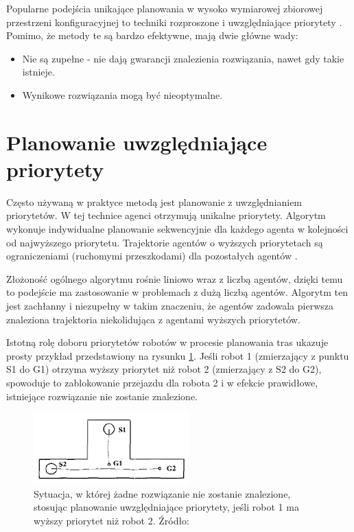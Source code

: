 Popularne podejścia unikające planowania w wysoko wymiarowej zbiorowej przestrzeni konfiguracyjnej to techniki rozproszone i uwzględniające priorytety \cite{optpriorities}.
Pomimo, że metody te są bardzo efektywne, mają dwie główne wady:
\vspace{-0.5em}
\begin{itemize}[itemsep=0em]
	\item Nie są zupełne - nie dają gwarancji znalezienia rozwiązania, nawet gdy takie istnieje.
	\item Wynikowe rozwiązania mogą być nieoptymalne.
\end{itemize}


\section{Planowanie uwzględniające priorytety}
Często używaną w praktyce metodą jest planowanie z uwzględnianiem priorytetów. 
W tej technice agenci otrzymują unikalne priorytety. Algorytm wykonuje indywidualne planowanie sekwencyjnie dla każdego agenta w kolejności od najwyższego priorytetu. Trajektorie agentów o wyższych priorytetach są ograniczeniami (ruchomymi przeszkodami) dla pozostałych agentów \cite{async_decentralized_spacetime_cp}.

Złożoność ogólnego algorytmu rośnie liniowo wraz z liczbą agentów, dzięki temu to podejście ma zastosowanie w problemach z dużą liczbą agentów.
Algorytm ten jest zachłanny i niezupełny w takim znaczeniu, że agentów zadowala pierwsza znaleziona trajektoria niekolidująca z agentami wyższych priorytetów. 

Istotną rolę doboru priorytetów robotów w procesie planowania tras ukazuje prosty przykład przedstawiony na rysunku \ref{fig:image_article1_fig1}. Jeśli robot 1 (zmierzający z punktu S1 do G1) otrzyma wyższy priorytet niż robot 2 (zmierzający z S2 do G2), spowoduje to zablokowanie przejazdu dla robota 2 i w efekcie prawidłowe, istniejące rozwiązanie nie zostanie znalezione.
\begin{figure}
	\centering
	\includegraphics[width=6cm]{img/article1/fig1}
	\caption{Sytuacja, w której żadne rozwiązanie nie zostanie znalezione, stosując planowanie uwzględniające priorytety, jeśli robot 1 ma wyższy priorytet niż robot 2. Źródło: \cite{optpriorities}}
	\label{fig:image_article1_fig1}
\end{figure}

